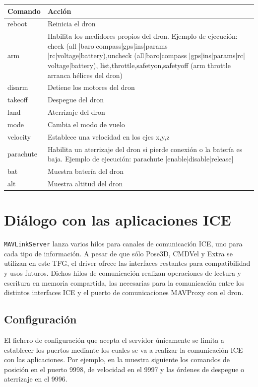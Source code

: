 \begin{center}
  \label{comandos}
  \begin{tabular}{ | l | p{11cm} |}
  \hline
  \textbf{Comando} & \textbf{Acción} \\ \hline
  reboot& Reinicia el dron\\ \hline
  arm & Habilita los medidores propios del dron. Ejemplo de ejecución: check (all |baro|compass|gps|ins|params |rc|voltage|battery),uncheck (all|baro|compass |gps|ins|params|rc| voltage|battery), list,throttle,safetyon,safetyoff (arm throttle arranca hélices del dron)\\ \hline
  disarm& Detiene los motores del dron \\ \hline
  takeoff& Despegue del dron\\ \hline
  land&Aterrizaje del dron \\ \hline
  mode& Cambia el modo de vuelo\\ \hline
  velocity& Establece una velocidad en los ejes x,y,z\\ \hline
  parachute& Habilita un aterrizaje del dron si pierde conexión o la batería es baja. Ejemplo de ejecución: parachute [enable|disable|release]\\ \hline
  bat& Muestra batería del dron\\ \hline
  alt& Muestra altitud del dron\\ \hline
  \end{tabular}
\end{center}

\section{Diálogo con las aplicaciones ICE}

\texttt{MAVLinkServer} lanza varios hilos para canales de comunicación ICE, uno para cada tipo de información. A pesar de que sólo Pose3D, CMDVel y Extra se utilizan en este TFG, el driver ofrece las interfaces restantes para compatibilidad y usos futuros. Dichos hilos de comunicación realizan operaciones de lectura y escritura en memoria compartida, las necesarias para la comunicación entre los distintos interfaces ICE y el puerto de comunicaciones MAVProxy con el dron.

\subsection{Configuración}
El fichero de configuración que acepta el servidor únicamente se limita a establecer los puertos mediante los cuales se va a realizar la comunicación ICE con las aplicaciones. Por ejemplo, en la muestra siguiente los comandos de posición en el puerto 9998, de velocidad en el 9997 y las órdenes de despegue o aterrizaje en el 9996.

